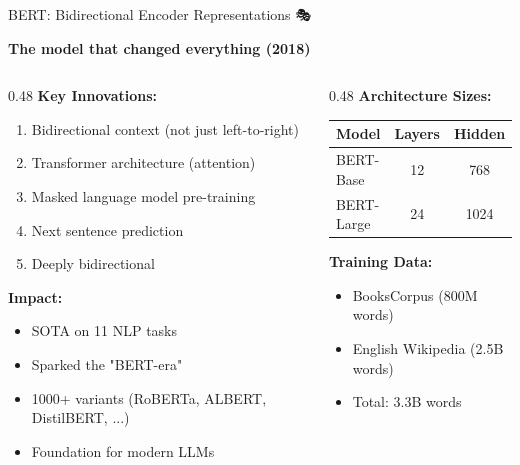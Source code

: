 \documentclass[aspectratio=169]{beamer}
\begin{document}
\begin{frame}[shrink=10]{BERT: Bidirectional Encoder Representations 🎭}
\begin{center}
\LARGE
\textbf{The model that changed everything (2018)}
\end{center}

\vspace{1em}

\begin{columns}[T]
\begin{column}{0.48\textwidth}
\textbf{Key Innovations:}
\begin{enumerate}\setlength{\itemsep}{0pt}
    \item \alert{Bidirectional} context (not just left-to-right)
    \item \alert{Transformer} architecture (attention)
    \item \alert{Masked language model} pre-training
    \item \alert{Next sentence prediction}
    \item Deeply bidirectional
\end{enumerate}

\vspace{0.5em}
\textbf{Impact:}
\begin{itemize}\setlength{\itemsep}{0pt}
    \item SOTA on 11 NLP tasks
    \item Sparked the "BERT-era"
    \item 1000+ variants (RoBERTa, ALBERT, DistilBERT, ...)
    \item Foundation for modern LLMs
\end{itemize}
\end{column}

\begin{column}{0.48\textwidth}
\textbf{Architecture Sizes:}

\vspace{0.5em}
\begin{tabular}{lcc}
\toprule
\textbf{Model} & \textbf{Layers} & \textbf{Hidden} \\
\midrule
BERT-Base & 12 & 768 \\
BERT-Large & 24 & 1024 \\
\bottomrule
\end{tabular}

\vspace{1em}
\textbf{Training Data:}
\begin{itemize}\setlength{\itemsep}{0pt}
    \item BooksCorpus (800M words)
    \item English Wikipedia (2.5B words)
    \item Total: 3.3B words
\end{itemize}


\end{column}
\end{columns}
\end{frame}
\end{document}
